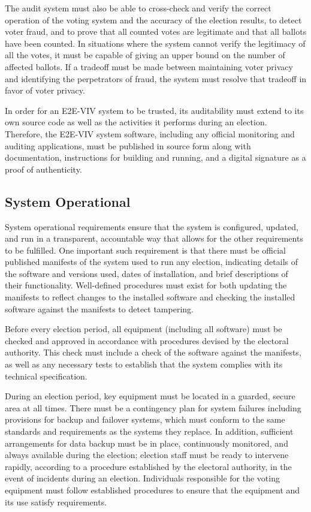 The audit system must also be able to cross-check and verify the
correct operation of the voting system and the accuracy of the
election results, to detect voter fraud, and to prove that all counted
votes are legitimate and that all ballots have been counted. In
situations where the system cannot verify the legitimacy of all the
votes, it must be capable of giving an upper bound on the number of
affected ballots. If a tradeoff must be made between maintaining voter
privacy and identifying the perpetrators of fraud, the system must
resolve that tradeoff in favor of voter privacy.

In order for an E2E-VIV system to be trusted, its auditability must
extend to its own source code as well as the activities it performs
during an election. Therefore, the E2E-VIV system software, including
any official monitoring and auditing applications, must be published
in source form along with documentation, instructions for building and
running, and a digital signature as a proof of authenticity.

\subsection{System Operational}

System operational requirements ensure that the system is configured,
updated, and run in a transparent, accountable way that allows for the
other requirements to be fulfilled. One important such requirement is
that there must be official published manifests of the system used to
run any election, indicating details of the software and versions
used, dates of installation, and brief descriptions of their
functionality. Well-defined procedures must exist for both updating
the manifests to reflect changes to the installed software and
checking the installed software against the manifests to detect
tampering.

Before every election period, all equipment (including all software)
must be checked and approved in accordance with procedures devised by
the electoral authority. This check must include a check of the
software against the manifests, as well as any necessary tests to
establish that the system complies with its technical specification.

During an election period, key equipment must be located in a guarded,
secure area at all times. There must be a contingency plan for system
failures including provisions for backup and failover systems, which
must conform to the same standards and requirements as the systems
they replace. In addition, sufficient arrangements for data backup
must be in place, continuously monitored, and always available during
the election; election staff must be ready to intervene rapidly,
according to a procedure established by the electoral authority, in
the event of incidents during an election. Individuals responsible for
the voting equipment must follow established procedures to ensure that
the equipment and its use satisfy requirements.
 
